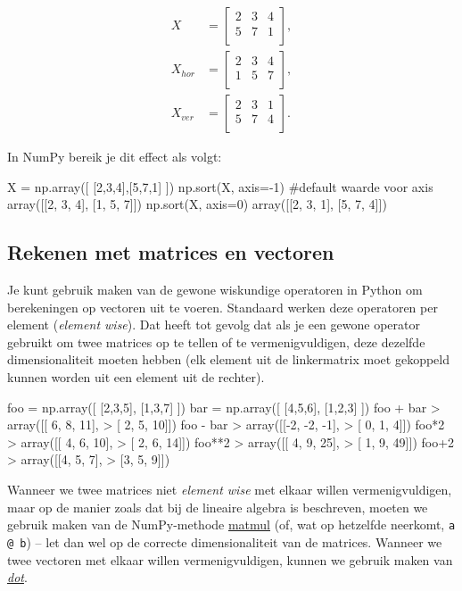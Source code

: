 \[
\begin{aligned}
X &=
\begin{bmatrix}
2 & 3 & 4 \\
5 & 7 & 1 \\
\end{bmatrix},\\
X_{hor} &=
\begin{bmatrix}
2 & 3 & 4 \\
1 & 5 & 7 \\
\end{bmatrix},\\
X_{ver} &=
\begin{bmatrix}
2 & 3 & 1\\
5 & 7 & 4\\
\end{bmatrix}.
\end{aligned}
\]

In NumPy bereik je dit effect als volgt:

\begin{python}
X = np.array([ [2,3,4],[5,7,1] ])
np.sort(X, axis=-1) #default waarde voor axis
array([[2, 3, 4],
       [1, 5, 7]])
np.sort(X, axis=0)
array([[2, 3, 1],
       [5, 7, 4]])

\end{python}

\subsection{Rekenen met matrices en vectoren}
Je kunt gebruik maken van de gewone wiskundige operatoren in Python om berekeningen op vectoren uit te voeren. Standaard werken deze operatoren per element (\textit{element wise}). Dat heeft tot gevolg dat als je een gewone operator gebruikt om twee matrices op te tellen of te vermenigvuldigen, deze dezelfde dimensionaliteit moeten hebben (elk element uit de linkermatrix moet gekoppeld kunnen worden uit een element uit de rechter).

\begin{python}
foo = np.array([ [2,3,5], [1,3,7] ])
bar = np.array([ [4,5,6], [1,2,3] ])
foo + bar
> array([[ 6,  8, 11],
>       [ 2,  5, 10]])
foo - bar
> array([[-2, -2, -1],
>       [ 0,  1,  4]])
foo*2
> array([[ 4,  6, 10],
>       [ 2,  6, 14]])
foo**2
> array([[ 4,  9, 25],
>       [ 1,  9, 49]])
foo+2
> array([[4, 5, 7],
>       [3, 5, 9]])
\end{python}

Wanneer we twee matrices niet \textit{element wise} met elkaar willen vermenigvuldigen, maar op de manier zoals dat bij de lineaire algebra is beschreven, moeten we gebruik maken van de NumPy-methode \href{https://docs.scipy.org/doc/numpy/reference/generated/numpy.matmul.html#numpy.matmul}{matmul} (of, wat op hetzelfde neerkomt, \texttt{a @ b}) – let dan wel op de correcte dimensionaliteit van de matrices. Wanneer we twee vectoren met elkaar willen vermenigvuldigen, kunnen we gebruik maken van \textit{\href{https://docs.scipy.org/doc/numpy/reference/generated/numpy.dot.html}{dot}}.

